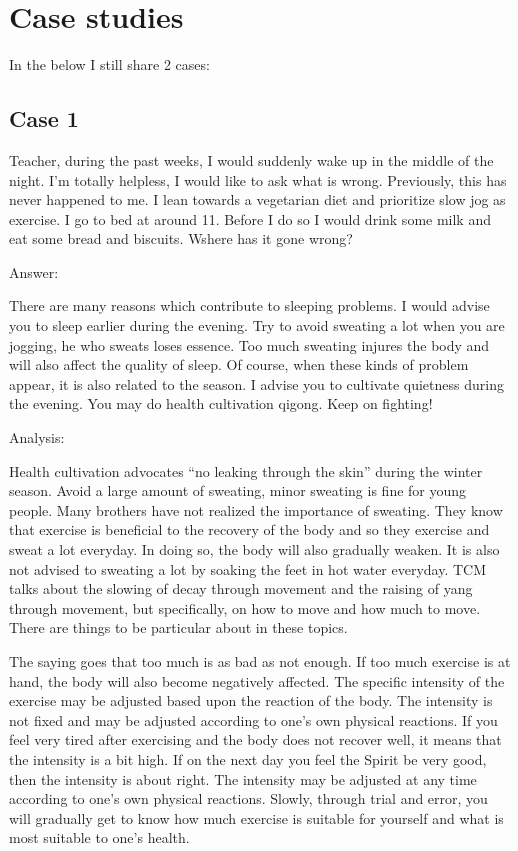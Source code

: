 \documentclass[
]{book}
\begin{document}
\hypertarget{case-studies-1}{%
\section{Case studies}\label{case-studies-1}}

In the below I still share 2 cases:

\hypertarget{case-1-1}{%
\subsection{Case 1}\label{case-1-1}}

Teacher, during the past weeks, I would suddenly wake up in the middle of the night. I'm totally helpless, I would like to ask what is wrong. Previously, this has never happened to me. I lean towards a vegetarian diet and prioritize slow jog as exercise. I go to bed at around 11. Before I do so I would drink some milk and eat some bread and biscuits. Wshere has it gone wrong?

Answer:

There are many reasons which contribute to sleeping problems. I would advise you to sleep earlier during the evening. Try to avoid sweating a lot when you are jogging, he who sweats loses essence. Too much sweating injures the body and will also affect the quality of sleep. Of course, when these kinds of problem appear, it is also related to the season. I advise you to cultivate quietness during the evening. You may do health cultivation qigong. Keep on fighting!

Analysis:

Health cultivation advocates ``no leaking through the skin'' during the winter season. Avoid a large amount of sweating, minor sweating is fine for young people. Many brothers have not realized the importance of sweating. They know that exercise is beneficial to the recovery of the body and so they exercise and sweat a lot everyday. In doing so, the body will also gradually weaken. It is also not advised to sweating a lot by soaking the feet in hot water everyday. TCM talks about the slowing of decay through movement and the raising of yang through movement, but specifically, on how to move and how much to move. There are things to be particular about in these topics.

The saying goes that too much is as bad as not enough. If too much exercise is at hand, the body will also become negatively affected. The specific intensity of the exercise may be adjusted based upon the reaction of the body. The intensity is not fixed and may be adjusted according to one's own physical reactions. If you feel very tired after exercising and the body does not recover well, it means that the intensity is a bit high. If on the next day you feel the Spirit be very good, then the intensity is about right. The intensity may be adjusted at any time according to one's own physical reactions. Slowly, through trial and error, you will gradually get to know how much exercise is suitable for yourself and what is most suitable to one's health.
\end{document}
